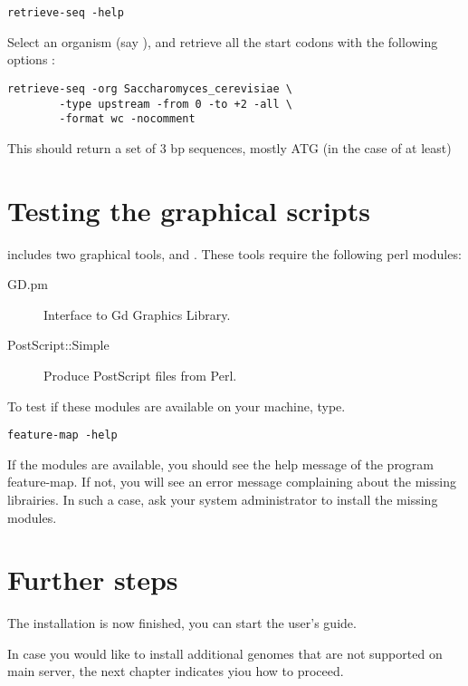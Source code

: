 \documentclass{book}
\begin{document}
\begin{verbatim}
retrieve-seq -help
\end{verbatim}

Select an organism (say ), and
retrieve all the start codons with the following options :

\begin{verbatim}
retrieve-seq -org Saccharomyces_cerevisiae \
        -type upstream -from 0 -to +2 -all \
        -format wc -nocomment 
\end{verbatim}

This should return a set of 3 bp sequences, mostly ATG (in the case of
 at least)

\section{Testing the graphical scripts}

\RSAT includes two graphical tools,  and
. These tools require the following  perl modules: 

\begin{description}
\item[GD.pm] Interface to Gd Graphics Library.
\item[PostScript::Simple]  Produce PostScript files from Perl.
\end{description}

To test if these modules are available on your machine, type.

\begin{verbatim}
feature-map -help
\end{verbatim}

If the modules are available, you should see the help message of the
program feature-map. If not, you will see an error message complaining
about the missing librairies. In such a case, ask your system
administrator to install the missing modules.

\section{Further steps}

The installation is now finished, you can start the user's guide. 

In case you would like to install additional genomes that are not
supported on \RSAT main server, the next chapter indicates yiou how to
proceed.
\end{document}
